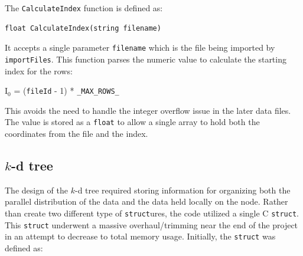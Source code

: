 \documentclass{article}
\begin{document}
The \texttt{CalculateIndex} function is defined as:

\begin{minipage}{\linewidth}
\lstset{language=C++, keepspaces=true}
\begin{lstlisting}
float CalculateIndex(string filename)
\end{lstlisting}
\end{minipage}

It accepts a single parameter \texttt{filename} which is the file being imported by \texttt{importFiles}. This function parses the numeric value to calculate the starting index for the rows:

\begin{center}
    I$_0$ = (\texttt{fileId} - 1) * \texttt{\_MAX\_ROWS\_}
\end{center}

This avoids the need to handle the integer overflow issue in the later data files. The value is stored as a \texttt{float} to allow a single array to hold both the coordinates from the file and the index.




%
%

\subsection{$k$-d tree}
%
%

The design of the $k$-d tree required storing information for organizing both the parallel distribution of the data and the data held locally on the node. Rather than create two different type of \texttt{struct}ures, the code utilized a single C \texttt{struct}. This \texttt{struct} underwent a massive overhaul/trimming near the end of the project in an attempt to decrease to total memory usage. Initially, the \texttt{struct} was defined as:
\end{document}
